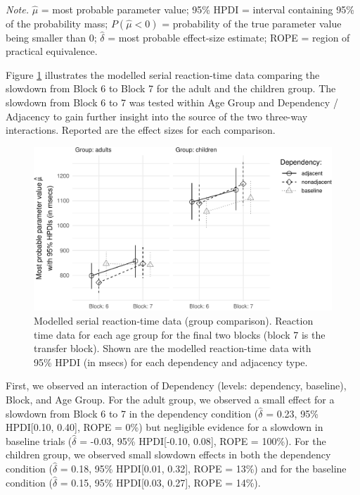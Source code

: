 \documentclass[
  english,
  man,floatsintext]{apa7}
\begin{document}
\begin{table}[ht]
\begin{center}
\begin{threeparttable}
\begin{tablenotes}[para]
\normalsize{\textit{Note.} $\hat{\mu}$ = most probable parameter value; 95\% HPDI = interval containing 95\% of the probability mass; $P(\hat{\mu}<0)$ = probability of the true parameter value being smaller than 0; $\hat{\delta}$ = most probable effect-size estimate; ROPE = region of practical equivalence.}
\end{tablenotes}

\end{threeparttable}
\end{center}

\end{table}

Figure \ref{fig:plotgroupcomp} illustrates the modelled serial reaction-time data comparing the slowdown from Block 6 to Block 7 for the adult and the children group. The slowdown from Block 6 to 7 was tested within Age Group and Dependency / Adjacency to gain further insight into the source of the two three-way interactions. Reported are the effect sizes for each comparison.

\begin{figure}[ht]

{\centering \includegraphics{Group-comparison_files/figure-latex/plotgroupcomp-1} 

}

\caption{Modelled serial reaction-time data (group comparison). Reaction time data for each age group for the final two blocks (block 7 is the transfer block). Shown are the modelled reaction-time data with 95\% HPDI (in msecs) for each dependency and adjacency type.}\label{fig:plotgroupcomp}
\end{figure}

First, we observed an interaction of Dependency (levels: dependency, baseline), Block, and Age Group. For the adult group, we observed a small effect for a slowdown from Block 6 to 7 in the dependency condition (\(\hat{\delta}\) = 0.23, 95\% HPDI{[}0.10, 0.40{]}, ROPE = 0\%) but negligible evidence for a slowdown in baseline trials (\(\hat{\delta}\) = -0.03, 95\% HPDI{[}-0.10, 0.08{]}, ROPE = 100\%). For the children group, we observed small slowdown effects in both the dependency condition (\(\hat{\delta}\) = 0.18, 95\% HPDI{[}0.01, 0.32{]}, ROPE = 13\%) and for the baseline condition (\(\hat{\delta}\) = 0.15, 95\% HPDI{[}0.03, 0.27{]}, ROPE = 14\%).
\end{document}
